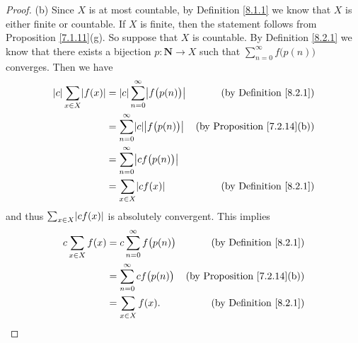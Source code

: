 \begin{proof}{(b)}
    Since \(X\) is at most countable, by Definition \ref{8.1.1} we know that \(X\) is either finite or countable.
    If \(X\) is finite, then the statement follows from Proposition \ref{7.1.11}(g).
    So suppose that \(X\) is countable.
    By Definition \ref{8.2.1} we know that there exists a bijection \(p : \mathbf{N} \to X\) such that \(\sum_{n = 0}^\infty f\big(p(n)\big)\) converges.
    Then we have
    \begin{align*}
        \abs*{c} \sum_{x \in X} \abs*{f(x)} & = \abs*{c} \sum_{n = 0}^\infty \abs*{f\big(p(n)\big)} & \text{(by Definition \ref{8.2.1})}      \\
                                            & = \sum_{n = 0}^\infty \abs*{c} \abs*{f\big(p(n)\big)} & \text{(by Proposition \ref{7.2.14}(b))} \\
                                            & = \sum_{n = 0}^\infty \abs*{c f\big(p(n)\big)}                                                  \\
                                            & = \sum_{x \in X} \abs*{c f(x)}                        & \text{(by Definition \ref{8.2.1})}
    \end{align*}
    and thus \(\sum_{x \in X} \abs*{c f(x)}\) is absolutely convergent.
    This implies
    \begin{align*}
        c \sum_{x \in X} f(x) & = c \sum_{n = 0}^\infty f\big(p(n)\big) & \text{(by Definition \ref{8.2.1})}      \\
                              & = \sum_{n = 0}^\infty c f\big(p(n)\big) & \text{(by Proposition \ref{7.2.14}(b))} \\
                              & = \sum_{x \in X} f(x).                  & \text{(by Definition \ref{8.2.1})}
    \end{align*}
\end{proof}

